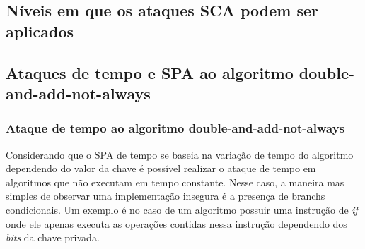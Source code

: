 \subsection{Níveis em que os ataques SCA podem ser aplicados}

\begin{comment}
\subsubsection{Operações na curva}
\subsubsection{Operações no protocolo criptográfico}
\subsubsection{Transferência da chave entre diferentes memórias}
\subsubsection{Protocolo em nível de aplicação}
\end{comment}




\subsection{Ataques de tempo e SPA ao algoritmo double-and-add-not-always}

\subsubsection{Ataque de tempo ao algoritmo double-and-add-not-always}
Considerando que o SPA de tempo se baseia na variação de tempo do algoritmo dependendo do valor da chave é possível realizar o ataque de tempo em algoritmos que não executam em tempo constante. Nesse caso, a maneira mas simples de observar uma implementação insegura é a presença de branchs condicionais. Um exemplo é no caso de um algoritmo possuir uma instrução de \textit{if} onde ele apenas executa as operações contidas nessa instrução dependendo dos \textit{bits} da chave privada.

